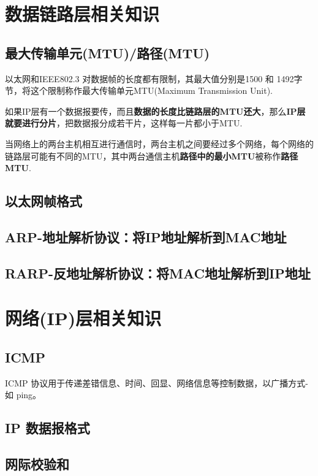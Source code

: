 \documentclass[UTF8,a4paper,12pt]{ctexbook}
\begin{document}
	\section{数据链路层相关知识}
		\subsection{最大传输单元(MTU)/路径(MTU)}
			以太网和IEEE802.3 对数据帧的长度都有限制，其最大值分别是1500 和 1492字节，将这个限制称作最大传输单元MTU(Maximum Transmission Unit).
			
			如果IP层有一个数据报要传，而且\textbf{数据的长度比链路层的MTU还大}，那么\textbf{IP层就要进行分片}，把数据报分成若干片，这样每一片都小于MTU.
			
			当网络上的两台主机相互进行通信时，两台主机之间要经过多个网络，每个网络的链路层可能有不同的MTU，其中两台通信主机\textbf{路径中的最小MTU}被称作\textbf{路径MTU}.
			
		\subsection{以太网帧格式}
		
		\subsection{ARP-地址解析协议：将IP地址解析到MAC地址}
		
		\subsection{RARP-反地址解析协议：将MAC地址解析到IP地址}
		
	\section{网络(IP)层相关知识}
		\subsection{ICMP}
			ICMP 协议用于传递差错信息、时间、回显、网络信息等控制数据，以广播方式-如 ping。
		\subsection{IP 数据报格式}
		
		\subsection{网际校验和}
		
\end{document}
